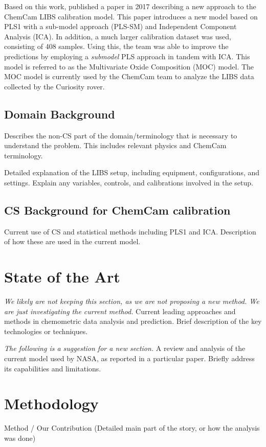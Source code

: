 Based on this work, \citeauthor{cleggRecalibrationMarsScience2017} published a paper in 2017 describing a new approach to the ChemCam LIBS calibration model.
This paper introduces a new model based on PLS1 with a sub-model approach (PLS-SM) and Independent Component Analysis (ICA).
In addition, a much larger calibration dataset was used, consisting of 408 samples.
Using this, the team was able to improve the predictions by employing a \textit{submodel} PLS approach in tandem with ICA.
This model is referred to as the Multivariate Oxide Composition (MOC) model.
The MOC model is currently used by the ChemCam team to analyze the LIBS data collected by the Curiosity rover.

\subsection{Domain Background}
Describes the non-CS part of the domain/terminology that is necessary to understand the problem.
This includes relevant physics and ChemCam terminology.

Detailed explanation of the LIBS setup, including equipment, configurations, and settings.
Explain any variables, controls, and calibrations involved in the setup.

\subsection{CS Background for ChemCam calibration}
Current use of CS and statistical methods including PLS1 and ICA.
Description of how these are used in the current model.

\section{State of the Art}
\textit{We likely are not keeping this section, as we are not proposing a new method. We are just investigating the current method.}
Current leading approaches and methods in chemometric data analysis and prediction.
Brief description of the key technologies or techniques.

\textit{The following is a suggestion for a new section.}
A review and analysis of the current model used by NASA, as reported in a particular paper.
Briefly address its capabilities and limitations.

\section{Methodology}
Method / Our Contribution (Detailed main part of the story, or how the analysis was done)


